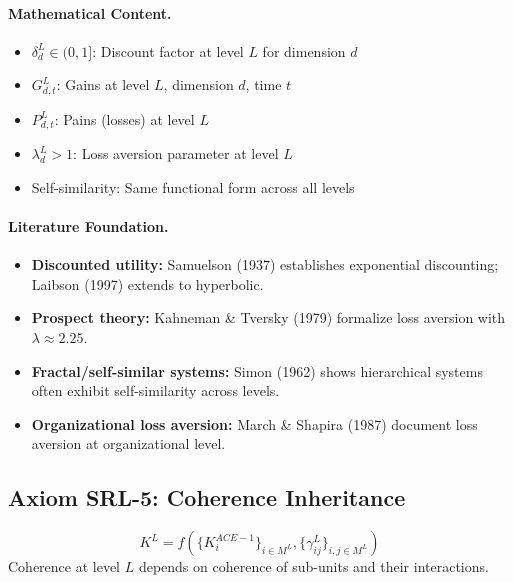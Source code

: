 \paragraph{Mathematical Content.}
\begin{itemize}
\item $\delta^L_d \in (0,1]$: Discount factor at level $L$ for dimension $d$
\item $G^L_{d,t}$: Gains at level $L$, dimension $d$, time $t$
\item $P^L_{d,t}$: Pains (losses) at level $L$
\item $\lambda^L_d > 1$: Loss aversion parameter at level $L$
\item Self-similarity: Same functional form across all levels
\end{itemize}

\paragraph{Literature Foundation.}
\begin{itemize}
\item \textbf{Discounted utility:} Samuelson (1937) establishes exponential 
discounting; Laibson (1997) extends to hyperbolic.
\item \textbf{Prospect theory:} Kahneman \& Tversky (1979) formalize loss 
aversion with $\lambda \approx 2.25$.
\item \textbf{Fractal/self-similar systems:} Simon (1962) shows hierarchical 
systems often exhibit self-similarity across levels.
\item \textbf{Organizational loss aversion:} March \& Shapira (1987) document 
loss aversion at organizational level.
\end{itemize}

\subsection{Axiom SRL-5: Coherence Inheritance}

\begin{tcolorbox}[colback=gray!5!white, colframe=gray!75!black, title=Axiom SRL-5: Coherence Inheritance]
\begin{equation}
\boxed{
K^L = f\left( \{K^{ACE-1}_i\}_{i \in M^L}, \{\gamma^L_{ij}\}_{i,j \in M^L} \right)
}
\end{equation}
Coherence at level $L$ depends on coherence of sub-units and their interactions.
\end{tcolorbox}

